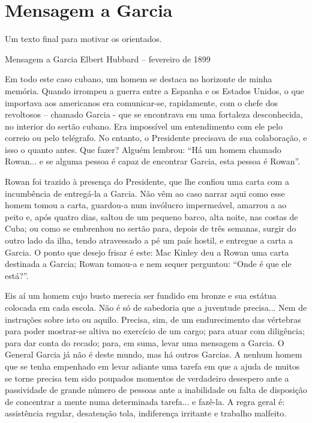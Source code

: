 \chapter{Mensagem a Garcia}

Um texto final para motivar os orientados.

Mensagem a Garcia Elbert Hubbard – fevereiro de 1899

Em todo este caso cubano, um homem se destaca no horizonte de minha memória. Quando irrompeu a guerra entre a Espanha e os Estados Unidos, o que importava aos americanos era comunicar-se, rapidamente, com o chefe dos revoltosos – chamado Garcia - que se encontrava em uma fortaleza desconhecida, no interior do sertão cubano. Era impossível um entendimento com ele pelo correio ou pelo telégrafo. No entanto, o Presidente precisava de sua colaboração, e isso o quanto antes. Que fazer? Alguém lembrou: ``Há um homem chamado Rowan... e se alguma pessoa é capaz de encontrar Garcia, esta pessoa é Rowan''.

Rowan foi trazido à presença do Presidente, que lhe confiou uma carta com a incumbência de entregá-la a Garcia. Não vêm ao caso narrar aqui como esse homem tomou a carta, guardou-a num invólucro impermeável, amarrou a ao peito e, após quatro dias, saltou de um pequeno barco, alta noite, nas costas de Cuba; ou como se embrenhou no sertão para, depois de três semanas, surgir do outro lado da ilha, tendo atravessado a pé um país hostil, e entregue a carta a Garcia. O ponto que desejo frisar é este: Mac Kinley deu a Rowan uma carta destinada a Garcia; Rowan tomou-a e nem sequer perguntou: ``Onde é que ele está?''.

Eis aí um homem cujo busto merecia ser fundido em bronze e sua estátua colocada em cada escola. Não é só de sabedoria que a juventude precisa... Nem de instruções sobre isto ou aquilo. Precisa, sim, de um endurecimento das vértebras para poder mostrar-se altiva no exercício de um cargo; para atuar com diligência; para dar conta do recado; para, em suma, levar uma mensagem a Garcia. O General Garcia já não é deste mundo, mas há outros Garcias. A nenhum homem que se tenha empenhado em levar adiante uma tarefa em que a ajuda de muitos se torne precisa tem sido poupados momentos de verdadeiro desespero ante a passividade de grande número de pessoas ante a inabilidade ou falta de disposição de concentrar a mente numa determinada tarefa... e fazê-la. A regra geral é: assistência regular, desatenção tola, indiferença irritante e trabalho malfeito.

